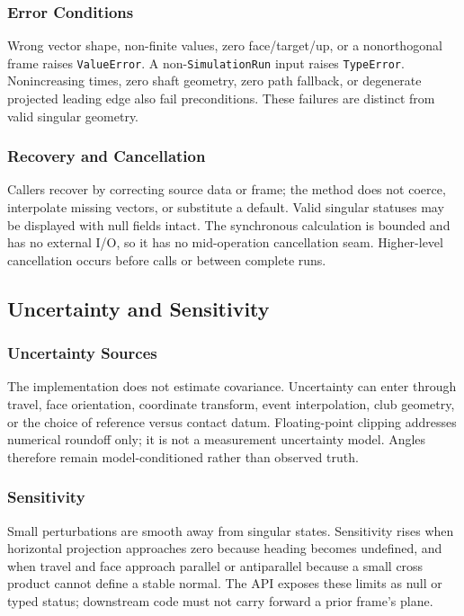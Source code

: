 \documentclass[
  american,
]{article}
\begin{document}
\subsubsection{Error Conditions}\label{error-conditions}

Wrong vector shape, non-finite values, zero face/target/up, or a
nonorthogonal frame raises \texttt{ValueError}. A
non-\texttt{SimulationRun} input raises \texttt{TypeError}.
Nonincreasing times, zero shaft geometry, zero path fallback, or
degenerate projected leading edge also fail preconditions. These
failures are distinct from valid singular geometry.

\subsubsection{Recovery and
Cancellation}\label{recovery-and-cancellation}

Callers recover by correcting source data or frame; the method does not
coerce, interpolate missing vectors, or substitute a default. Valid
singular statuses may be displayed with null fields intact. The
synchronous calculation is bounded and has no external I/O, so it has no
mid-operation cancellation seam. Higher-level cancellation occurs before
calls or between complete runs.

\subsection{Uncertainty and
Sensitivity}\label{uncertainty-and-sensitivity}

\subsubsection{Uncertainty Sources}\label{uncertainty-sources}

The implementation does not estimate covariance. Uncertainty can enter
through travel, face orientation, coordinate transform, event
interpolation, club geometry, or the choice of reference versus contact
datum. Floating-point clipping addresses numerical roundoff only; it is
not a measurement uncertainty model. Angles therefore remain
model-conditioned rather than observed truth.

\subsubsection{Sensitivity}\label{sensitivity}

Small perturbations are smooth away from singular states. Sensitivity
rises when horizontal projection approaches zero because heading becomes
undefined, and when travel and face approach parallel or antiparallel
because a small cross product cannot define a stable normal. The API
exposes these limits as null or typed status; downstream code must not
carry forward a prior frame's plane.
\end{document}
